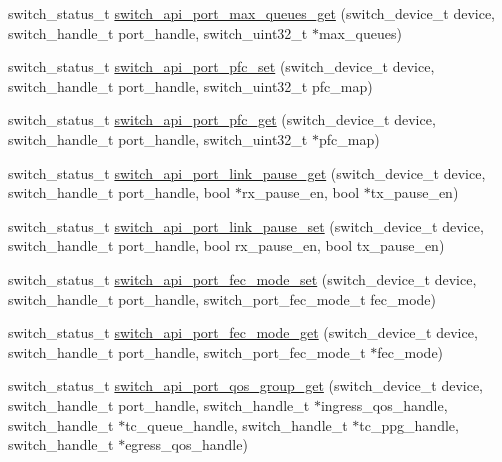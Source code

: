 \begin{DoxyCompactItemize}
\item 
switch\+\_\+status\+\_\+t \hyperlink{group__Port_gaa8c0716de3a44d4465c8b32fa965df19}{switch\+\_\+api\+\_\+port\+\_\+max\+\_\+queues\+\_\+get} (switch\+\_\+device\+\_\+t device, switch\+\_\+handle\+\_\+t port\+\_\+handle, switch\+\_\+uint32\+\_\+t $\ast$max\+\_\+queues)
\item 
switch\+\_\+status\+\_\+t \hyperlink{group__Port_ga50d0641af0a5154d176b9ddef5787be4}{switch\+\_\+api\+\_\+port\+\_\+pfc\+\_\+set} (switch\+\_\+device\+\_\+t device, switch\+\_\+handle\+\_\+t port\+\_\+handle, switch\+\_\+uint32\+\_\+t pfc\+\_\+map)
\item 
switch\+\_\+status\+\_\+t \hyperlink{group__Port_ga8519f53fe4f6365f81abc897d3353b32}{switch\+\_\+api\+\_\+port\+\_\+pfc\+\_\+get} (switch\+\_\+device\+\_\+t device, switch\+\_\+handle\+\_\+t port\+\_\+handle, switch\+\_\+uint32\+\_\+t $\ast$pfc\+\_\+map)
\item 
switch\+\_\+status\+\_\+t \hyperlink{group__Port_ga374a398006d8165eab6586c936ecbc3c}{switch\+\_\+api\+\_\+port\+\_\+link\+\_\+pause\+\_\+get} (switch\+\_\+device\+\_\+t device, switch\+\_\+handle\+\_\+t port\+\_\+handle, bool $\ast$rx\+\_\+pause\+\_\+en, bool $\ast$tx\+\_\+pause\+\_\+en)
\item 
switch\+\_\+status\+\_\+t \hyperlink{group__Port_ga7afd7387c49cd43b49955440669e8650}{switch\+\_\+api\+\_\+port\+\_\+link\+\_\+pause\+\_\+set} (switch\+\_\+device\+\_\+t device, switch\+\_\+handle\+\_\+t port\+\_\+handle, bool rx\+\_\+pause\+\_\+en, bool tx\+\_\+pause\+\_\+en)
\item 
switch\+\_\+status\+\_\+t \hyperlink{group__Port_ga12efba678f117f3402fef2f70cdbb1c9}{switch\+\_\+api\+\_\+port\+\_\+fec\+\_\+mode\+\_\+set} (switch\+\_\+device\+\_\+t device, switch\+\_\+handle\+\_\+t port\+\_\+handle, switch\+\_\+port\+\_\+fec\+\_\+mode\+\_\+t fec\+\_\+mode)
\item 
switch\+\_\+status\+\_\+t \hyperlink{group__Port_ga5dd7d6e3827bddc801ae0dfb8232adb4}{switch\+\_\+api\+\_\+port\+\_\+fec\+\_\+mode\+\_\+get} (switch\+\_\+device\+\_\+t device, switch\+\_\+handle\+\_\+t port\+\_\+handle, switch\+\_\+port\+\_\+fec\+\_\+mode\+\_\+t $\ast$fec\+\_\+mode)
\item 
switch\+\_\+status\+\_\+t \hyperlink{group__Port_ga6fb574dd86a62bb26a18e797190cb4f5}{switch\+\_\+api\+\_\+port\+\_\+qos\+\_\+group\+\_\+get} (switch\+\_\+device\+\_\+t device, switch\+\_\+handle\+\_\+t port\+\_\+handle, switch\+\_\+handle\+\_\+t $\ast$ingress\+\_\+qos\+\_\+handle, switch\+\_\+handle\+\_\+t $\ast$tc\+\_\+queue\+\_\+handle, switch\+\_\+handle\+\_\+t $\ast$tc\+\_\+ppg\+\_\+handle, switch\+\_\+handle\+\_\+t $\ast$egress\+\_\+qos\+\_\+handle)

\end{DoxyCompactItemize}
